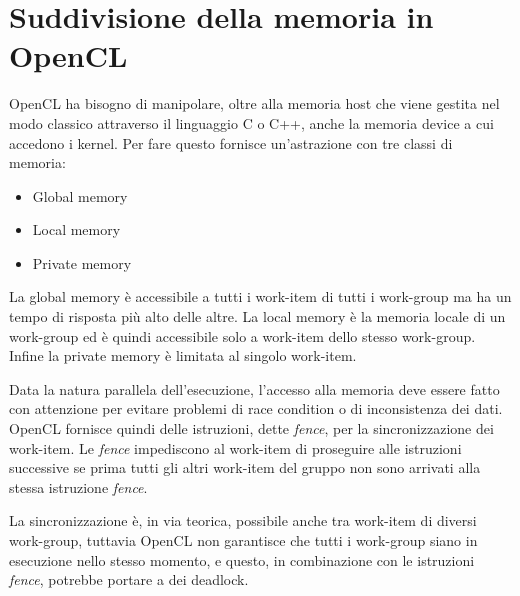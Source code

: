 \section{Suddivisione della memoria in OpenCL}

OpenCL ha bisogno di manipolare, oltre alla memoria host che viene gestita nel modo classico attraverso il linguaggio C o C++, anche la memoria device a cui accedono i kernel. 
Per fare questo fornisce un'astrazione con tre classi di memoria:

\begin{itemize}
	\item Global memory
	\item Local memory
	\item Private memory
\end{itemize}

La global memory è accessibile a tutti i work-item di tutti i work-group ma ha un tempo di risposta più alto delle altre.
La local memory è la memoria locale di un work-group ed è quindi accessibile solo a work-item dello stesso work-group.
Infine la private memory è limitata al singolo work-item.

Data la natura parallela dell'esecuzione, l'accesso alla memoria deve essere fatto con attenzione per evitare problemi di race condition o di inconsistenza dei dati.
OpenCL fornisce quindi delle istruzioni, dette \textit{fence}, per la sincronizzazione dei work-item. Le \textit{fence} impediscono al work-item di proseguire alle istruzioni successive se prima tutti gli altri work-item del gruppo non sono arrivati alla stessa istruzione \textit{fence}.

La sincronizzazione è, in via teorica, possibile anche tra work-item di diversi work-group, tuttavia OpenCL non garantisce che tutti i work-group siano in esecuzione nello stesso momento, e questo, in combinazione con le istruzioni \textit{fence}, potrebbe portare a dei deadlock.